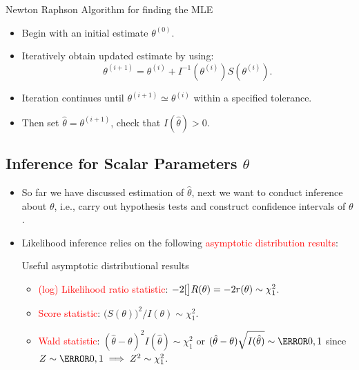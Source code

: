 \documentclass[oneside]{book}\usepackage[]{graphicx}\usepackage[svgnames]{xcolor}
\let\log\relax%
\begin{document}
\begin{Regular}{Newton Raphson Algorithm for finding the MLE}
      \begin{itemize}
            \item Begin with an initial estimate $ \theta^{(0)} $.
            \item Iteratively obtain updated estimate by using:
                  \[ \theta^{(i+1)}=\theta^{(i)}+I^{-1}(\theta^{(i)})S(\theta^{(i)}). \]
            \item Iteration continues until $ \theta^{(i+1)}\simeq \theta^{(i)} $ within a specified tolerance.
            \item Then set $ \hat{\theta}=\theta^{(i+1)} $, check that $ I(\hat{\theta})>0 $.
      \end{itemize}
\end{Regular}
\subsection*{Inference for Scalar Parameters $ \theta $}
\begin{itemize}
      \item So far we have discussed estimation of $ \hat{\theta} $, next we want to conduct inference
            about $ \theta $, i.e., carry out hypothesis tests and construct confidence intervals of $ \theta $.
      \item Likelihood inference relies on the following \textcolor{Red}{asymptotic distribution results}:
            \begin{Regular}{Useful asymptotic distributional results}
                  \begin{itemize}
                        \item \textcolor{Red}{(log) Likelihood ratio statistic}: $ -2\log[\big]{R(\theta)}=-2r(\theta)\sim \chi^2_{1} $.
                        \item \textcolor{Red}{Score statistic}: $ \bigl(S(\theta)\bigr)^2/I(\theta)\sim \chi^2_{1} $.
                        \item \textcolor{Red}{Wald statistic}: $ (\hat{\theta}-\theta)^2 I(\hat{\theta}) \sim \chi^2_{1} $ or $ (\hat{\theta}-\theta)\sqrt{I(\hat{\theta})}\sim \N{0,1} $
                              since $ Z \sim \N{0,1} \implies Z^2 \sim \chi^2_{1} $.
                  \end{itemize}
            \end{Regular}
\end{itemize}
\end{document}
